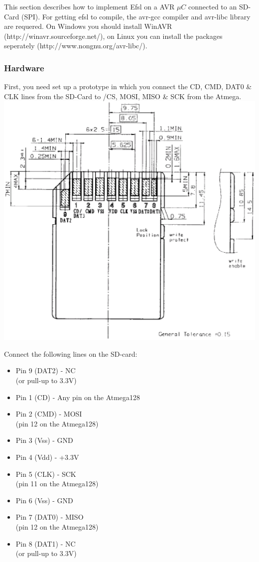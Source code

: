 This section describes how to implement Efsl on a AVR $\mu C$ connected to
an SD-Card (SPI). For getting efsl to compile, the avr-gcc compiler and 
avr-libc library are requered. On Windows you should install WinAVR 
(http://winavr.sourceforge.net/), on Linux you can install the packages 
seperately (http://www.nongnu.org/avr-libc/).
\subsubsection{Hardware}
First, you need set up a prototype in which you connect the CD, CMD, DAT0
\& CLK lines from the SD-Card to /CS, MOSI, MISO \& SCK from the Atmega.
\newline
\includegraphics[scale=0.65]{pics/sdcard.eps}
\newline
\parbox[c]{.5\textwidth}{
Connect the following lines on the SD-card:
\begin{itemize}
	\item{Pin 9 (DAT2) - NC\\(or pull-up to 3.3V)}
	\item{Pin 1 (CD) - Any pin on the Atmega128}
	\item{Pin 2 (CMD) - MOSI\\(pin 12 on the Atmega128)}
	\item{Pin 3 (Vss) - GND}
	\item{Pin 4 (Vdd) - +3.3V}
	\item{Pin 5 (CLK) - SCK\\(pin 11 on the Atmega128)}
	\item{Pin 6 (Vss) - GND}
	\item{Pin 7 (DAT0) - MISO\\(pin 12 on the Atmega128)}
	\item{Pin 8 (DAT1) - NC\\(or pull-up to 3.3V)}
\end{itemize}
}
